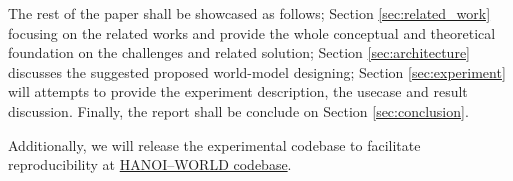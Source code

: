 The rest of the paper shall be showcased as follows; Section \ref{sec:related_work} focusing on the related works and provide the whole conceptual and theoretical foundation on the challenges and related solution; Section \ref{sec:architecture} discusses the suggested proposed world-model designing; Section \ref{sec:experiment} will attempts to provide the experiment description, the usecase and result discussion. Finally, the report shall be conclude on Section \ref{sec:conclusion}.

Additionally, we will release the experimental codebase to facilitate reproducibility at
\href{https://github.com/CS-3331-Fundamental-of-AI/WorldModel-Self-Driving-Car.git}{HANOI--WORLD codebase}.